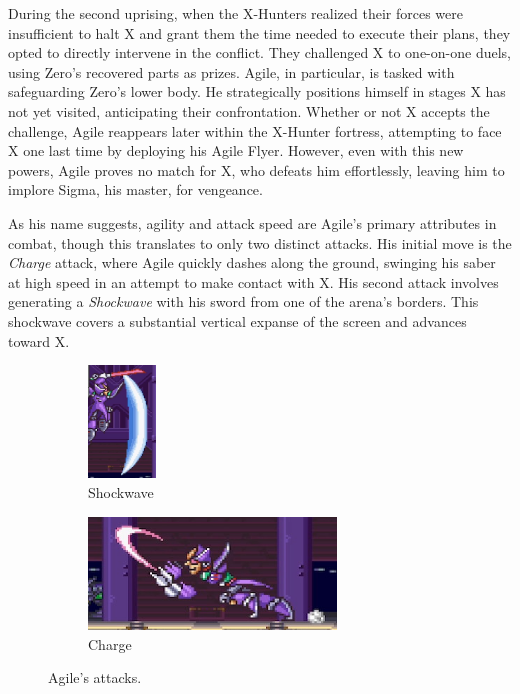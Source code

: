 During the second uprising, when the X-Hunters realized their forces were insufficient to halt X and grant them the time needed to execute their plans, they opted to directly intervene in the conflict. They challenged X to one-on-one duels, using Zero's recovered parts as prizes. Agile, in particular, is tasked with safeguarding Zero's lower body. He strategically positions himself in stages X has not yet visited, anticipating their confrontation. Whether or not X accepts the challenge, Agile reappears later within the X-Hunter fortress, attempting to face X one last time by deploying his Agile Flyer. However, even with this new powers, Agile proves no match for X, who defeats him effortlessly, leaving him to implore Sigma, his master, for vengeance.

As his name suggests, agility and attack speed are Agile's primary attributes in combat, though this translates to only two distinct attacks. His initial move is the \emph{Charge} attack, where Agile quickly dashes along the ground, swinging his saber at high speed in an attempt to make contact with X. His second attack involves generating a \emph{Shockwave} with his sword from one of the arena's borders. This shockwave covers a substantial vertical expanse of the screen and advances toward X.
\begin{figure}[htp]
	\centering
	\begin{subfigure}{0.2\linewidth}
		\centering
		\includegraphics[height=3cm]{figures/X2/Hunter_stages/Agile_crescent.png}
		\caption{Shockwave}	
	\end{subfigure}
	\begin{subfigure}{0.6\linewidth}
		\centering
		\includegraphics[height=3cm]{figures/X2/Hunter_stages/Agile_dash.png}
		\caption{Charge}
	\end{subfigure}
	\caption{Agile's attacks.}	
\end{figure}

